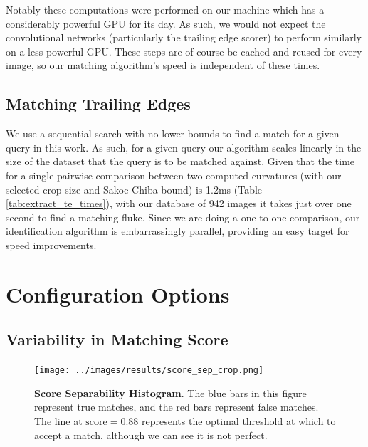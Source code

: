 Notably these computations were performed on our machine which has a considerably powerful GPU for its day.
As such, we would not expect the convolutional networks (particularly the trailing edge scorer) to perform similarly on a less powerful GPU.
These steps are of course be cached and reused for every image, so our matching algorithm's speed is independent of these times.


\subsection{Matching Trailing Edges}

We use a sequential search with no lower bounds to find a match for a given query in this work.
As such, for a given query our algorithm scales linearly in the size of the dataset that the query is to be matched against.
Given that the time for a single pairwise comparison between two computed curvatures (with our selected crop size and Sakoe-Chiba bound) is 1.2ms (Table \ref{tab:extract_te_times}), with our database of 942 images it takes just over one second to find a matching fluke.
Since we are doing a one-to-one comparison, our identification algorithm is embarrassingly parallel, providing an easy target for speed improvements.

\section{Configuration Options}

\subsection{Variability in Matching Score}

\begin{figure}[t]%
\centering
\texttt{[image: ../images/results/score\_sep\_crop.png]}
\caption{\textbf{Score Separability Histogram}. The blue bars in this figure represent true matches, and the red bars represent false matches. The line at $\text{score} = 0.88$ represents the optimal threshold at which to accept a match, although we can see it is not perfect.}
\label{fig:score_sep}
\end{figure}

